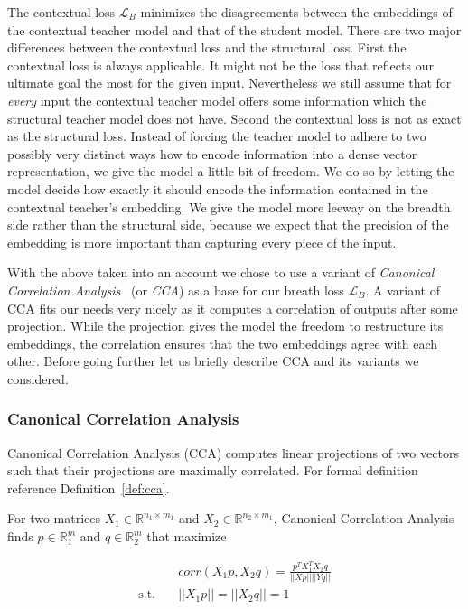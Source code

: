 The contextual loss $\mathcal{L}_B$ minimizes the disagreements between the
embeddings of the contextual teacher model  and that of the student model.
There are two major differences between the contextual loss and the structural
loss. First the contextual loss is always applicable. It might not be the loss
that reflects our ultimate goal the most for the given input. Nevertheless we
still assume that for \emph{every} input the contextual teacher model offers
some information which the structural teacher model does not have. Second the
contextual loss is not as exact as the structural loss. Instead of forcing the
teacher model to adhere to two possibly very distinct ways how to encode
information into a dense vector representation, we give the model a little bit
of freedom. We do so by letting the model decide how exactly it should encode
the information contained in the contextual teacher's embedding. We give the
model more leeway on the breadth side rather than the structural side, because
we expect that the precision of the embedding is more important than capturing
every piece of the input.

With the above taken into an account we chose to use a variant of
\emph{Canonical Correlation Analysis}~\cite{hotelling1992relations} (or
\emph{CCA}) as a base for our breath loss $\mathcal{L}_B$. A variant of CCA fits
our needs very nicely as it computes a correlation of outputs after some
projection. While the projection gives the model the freedom to restructure its
embeddings, the correlation ensures that the two embeddings agree with each
other. Before going further let us briefly describe CCA and its variants we
considered.

\subsubsection{Canonical Correlation Analysis}

Canonical Correlation Analysis (CCA) computes linear projections of two vectors
such that their projections are maximally correlated. For formal definition
reference Definition~\ref{def:cca}.

\begin{defn}\label{def:cca}

  For two matrices $X_1 \in \mathbb{R}^{n_1 \times m_1}$ and $X_2 \in
  \mathbb{R}^{n_2 \times m_1}$, Canonical Correlation Analysis finds $p \in
  \mathbb{R}^m_1$ and $q \in \mathbb{R}^m_2$ that maximize

  \begin{equation}
    \begin{split}
      & corr(X_1p, X_2q) = \frac{p^TX_1^TX_2q}{||Xp|| ||Yq||} \\
      \text{s.t.}\quad &||X_1p|| = ||X_2q|| = 1 \\
    \end{split}
  \end{equation}


\end{defn}

